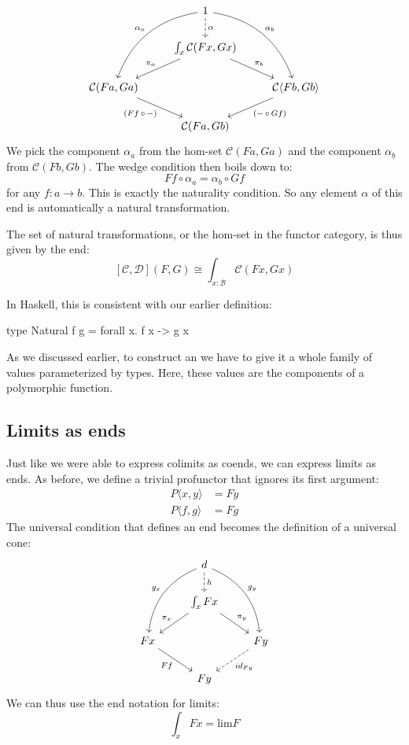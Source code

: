 \documentclass[DaoFP]{subfiles}
\begin{document}
\[
 \begin{tikzcd}
 & 1
 \arrow[d, dashed, "\alpha"]
\arrow[ddl, bend right, "\alpha_a"']
 \arrow[ddr, bend left, "\alpha_b"]
 \\
 & \int_{x} \mathcal{C}(F x, G x)
 \arrow[ld, "\pi_a"']
 \arrow[rd, "\pi_b"]
 \\
  \mathcal{C} ( F a, G a )
 \arrow[dr, "{(F f \, \circ \, -)}"']
 && \mathcal{C} \langle F b, G b \rangle
 \arrow[dl, "{(- \, \circ\, G f)}"]
 \\
 &  \mathcal{C} ( F a, G b )
 \end{tikzcd}
\]
We pick the component $\alpha_a$ from the hom-set $\mathcal{C} ( F a, G a )$ and the component $\alpha_b$ from $\mathcal{C} ( F b, G b )$. The wedge condition then boils down to:
\[ F f \circ \alpha_a = \alpha_b \circ G f \]
for any $f \colon a \to b$. This is exactly the naturality condition. So any element $\alpha$ of this end is automatically a natural transformation.

The set of natural transformations, or the hom-set in the functor category, is thus given by the end:
\[ [\mathcal{C}, \mathcal{D}] (F, G) \cong \int_{x \colon  \mathcal{B}} \mathcal{C}(F x, G x)\]

In Haskell, this is consistent with our earlier definition:
\begin{haskell}
type Natural f g = forall x. f x -> g x
\end{haskell}

As we discussed earlier, to construct an  we have to give it a whole family of values parameterized by types. Here, these values are the components of a polymorphic function. 

\subsection{Limits as ends}
Just like we were able to express colimits as coends, we can express limits as ends. As before, we define a trivial profunctor that ignores its first argument:
\begin{align*}
 P \langle x, y \rangle &= F y \\
 P \langle f, g \rangle &= F g 
\end{align*}
The universal condition that defines an end becomes the definition of a universal cone:
\[
 \begin{tikzcd}
 &d
 \arrow[ddl, bend right, "g_x"']
 \arrow[ddr, bend left, "g_y"]
 \arrow[d, dashed, "h"]
 \\
 & \int_x F x
 \arrow[ld, "\pi_x"']
 \arrow[rd, "\pi_y"]
 \\
 F x
 \arrow[dr, "F f"']
 &&F y
 \arrow[dl, dashed, "id_{F y}"]
 \\
 & F y
 \end{tikzcd}
\]
We can thus use the end notation for limits:
\[ \int_x F x = \text{lim} F \]
\end{document}
